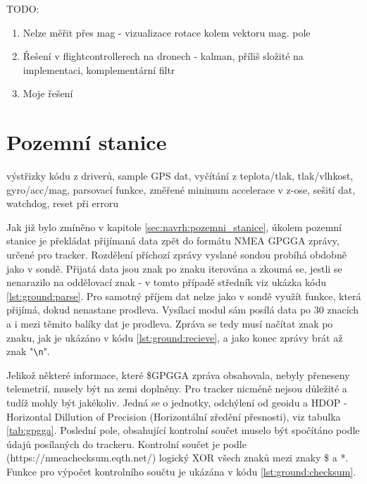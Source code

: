 \documentclass[twoside]{ctuthesis}
\theoremstyle{plain}
\theoremstyle{definition}
\theoremstyle{note}
\begin{document}
	
	
TODO:
	\begin{enumerate}
		\item Nelze měřit přes mag - vizualizace rotace kolem vektoru mag. pole
		\item Řešení v flightcontrollerech na dronech - kalman, příliš složité na implementaci, komplementární filtr
		\item Moje řešení
	\end{enumerate}
	









	

	







	\section{Pozemní stanice}
	výstřizky kódu z driverů, sample GPS dat, vyčítání z teplota/tlak, tlak/vlhkost, gyro/acc/mag, parsovací funkce, změřené minimum accelerace v z-ose, sešití dat, watchdog, reset při erroru

	Jak již bylo zmíněno v kapitole \ref{sec:navrh:pozemni_stanice}, úkolem pozemní stanice je překládat přijímaná data zpět do formátu NMEA GPGGA zprávy, určené pro tracker. Rozdělení příchozí zprávy vyslané sondou probíhá obdobně jako v sondě. Přijatá data jsou znak po znaku iterována a zkoumá se, jestli se nenarazilo na oddělovací znak - v tomto případě středník viz ukázka kódu \ref{lst:ground:parse}. Pro samotný příjem dat nelze jako v sondě využít funkce, která přijímá, dokud nenastane prodleva. Vysílací modul sám posílá data po 30 znacích a i mezi těmito balíky dat je prodleva. Zpráva se tedy musí načítat znak po znaku, jak je ukázáno v kódu \ref{lst:ground:recieve}, a jako konec zprávy brát až znak "\lstinline |\n|".

	

	

	Jelikož některé informace, které \$GPGGA zpráva obsahovala, nebyly přeneseny telemetrií, musely být na zemi doplněny. Pro tracker nicméně nejsou důležité a tudíž mohly být jakékoliv. Jedná se o jednotky, odchýlení od geoidu a HDOP - Horizontal Dillution of Precision (Horizontální zředění přesnosti), viz tabulka \ref{tab:gpgga}. Poslední pole, obsahující kontrolní součet muselo být spočítáno podle údajů posílaných do trackeru. Kontrolní součet je podle (https://nmeachecksum.eqth.net/) logický XOR všech znaků mezi znaky \$ a *. Funkce pro výpočet kontrolního součtu je ukázána v kódu \ref{lst:ground:checksum}.
\end{document}

